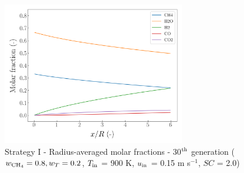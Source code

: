 \documentclass[preprint,12pt]{elsarticle}
\begin{document}
\begin{figure}[h!]
\centering
\includegraphics[width=80mm]{results/5/80C_20T/GEN30-AVG.png}
\caption{\label{fig:5R8020G30-avg} Strategy I - Radius-averaged molar fractions -  30$^{\rm{th}}$ generation ($w_{\rm{CH_4}} = 0.8, w_T = 0.2$, $T_{\rm{in}}$ = 900 K, $u_{\rm{in}}$ = 0.15 m s$^{-1}$, $SC$ = 2.0)}
\end{figure}
\end{document}
